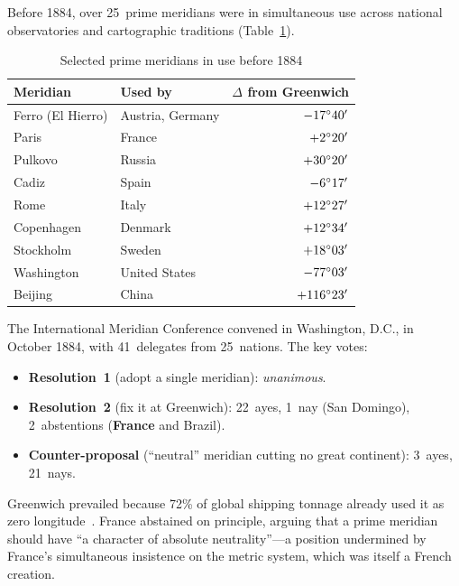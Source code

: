 \documentclass[10pt,a4paper]{article}
\begin{document}
Before 1884, over 25~prime meridians were in simultaneous use across
national observatories and cartographic traditions (Table~\ref{tab:meridians}).

\begin{table}[H]
\centering
\caption{Selected prime meridians in use before 1884}
\label{tab:meridians}
\small
\begin{tabular}{@{}llr@{}}
\toprule
\textbf{Meridian} & \textbf{Used by} & \textbf{$\Delta$ from Greenwich} \\
\midrule
Ferro (El Hierro)  & Austria, Germany       & $-17\degree 40'$ \\
Paris              & France                 & $+2\degree 20'$ \\
Pulkovo            & Russia                 & $+30\degree 20'$ \\
Cadiz              & Spain                  & $-6\degree 17'$ \\
Rome               & Italy                  & $+12\degree 27'$ \\
Copenhagen         & Denmark                & $+12\degree 34'$ \\
Stockholm          & Sweden                 & $+18\degree 03'$ \\
Washington         & United States          & $-77\degree 03'$ \\
Beijing            & China                  & $+116\degree 23'$ \\
\bottomrule
\end{tabular}
\end{table}

The International Meridian Conference convened in Washington, D.C., in October
1884, with 41~delegates from 25~nations. The key votes:

\begin{itemize}[nosep]
  \item \textbf{Resolution~1} (adopt a single meridian): \emph{unanimous}.
  \item \textbf{Resolution~2} (fix it at Greenwich): 22~ayes, 1~nay
    (San Domingo), 2~abstentions (\textbf{France} and Brazil).
  \item \textbf{Counter-proposal} (``neutral'' meridian cutting no great
    continent): 3~ayes, 21~nays.
\end{itemize}

\noindent
Greenwich prevailed because 72\% of global shipping tonnage already used it
as zero longitude~\cite{howse1997}. France abstained on principle, arguing that a prime
meridian should have ``a character of absolute neutrality''---a position
undermined by France's simultaneous insistence on the metric system, which
was itself a French creation.
\end{document}
